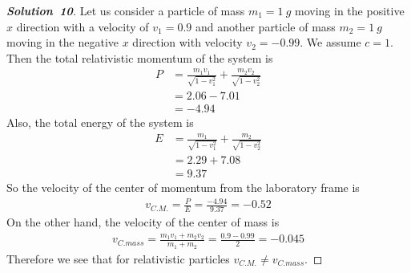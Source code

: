 \documentclass[11pt]{article}
\theoremstyle{definition}
\renewcommand*{\proofname}{\bf{Solution}}
\begin{document}
\cleardoublepage
\begin{proof}[\proofname\ 10]
Let us consider a particle of mass $m_1 = 1~g$ moving in the positive $x$
direction with a velocity of $v_1 = 0.9$ and another particle of mass
$m_2 = 1~g$ moving in the negative $x$ direction with velocity $v_2 = -0.99$.
We assume $c = 1$. Then the total relativistic momentum of  the system is
\begin{align*}
    P &= \frac{m_1 v_1}{\sqrt{1 - v_1^2}} + \frac{m_2 v_2}{\sqrt{1 - v_2^2}} \\
    &= 2.06 - 7.01 \\
    &= -4.94
\end{align*}
Also, the total energy of the system is
\begin{align*}
    E &= \frac{m_1}{\sqrt{1 - v_1^2}} + \frac{m_2}{\sqrt{1 - v_2^2}} \\
    &= 2.29 + 7.08 \\
    &= 9.37
\end{align*}
So the velocity of the center of momentum from the laboratory frame is
\begin{align*}
    v_{C.M.} = \frac{P}{E} = \frac{-4.94}{9.37} = -0.52
\end{align*}
On the other hand, the velocity of the center of mass is
\begin{align*}
    v_{C.mass} = \frac{m_1v_1 + m_2v_2}{m_1 + m_2} = \frac{0.9 - 0.99}{2}
    = - 0.045
\end{align*}
Therefore we see that for relativistic particles $v_{C.M.} \neq v_{C.mass}$.


\end{proof}
\end{document}
